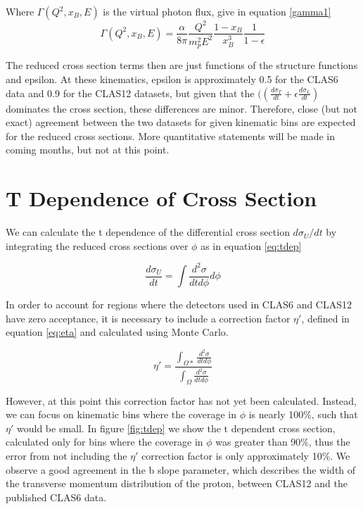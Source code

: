 Where $\Gamma (Q^2, x_B, E)$ is the virtual photon flux, give in equation \ref{gamma1}
 \begin{equation}\label{gamma1}
            \Gamma (Q^2, x_B, E) = \frac{\alpha}{8\pi} \frac{Q^2}{m^2_pE^2}\frac{1-x_B}{x_B^3}\frac{1}{1-\epsilon}
\end{equation}

The reduced cross section terms then are just functions of the structure functions and epsilon. At these kinematics, epsilon is approximately 0.5 for the CLAS6 data and 0.9 for the CLAS12 datasets, but given that the $((\frac{d\sigma_T}{dt}+\epsilon\frac{d\sigma_L}{dt})$ dominates the cross section, these differences are minor. Therefore, close (but not exact) agreement between the two datasets for given kinematic bins are expected for the reduced cross sections. More quantitative statements will be made in coming months, but not at this point.


\section{T Dependence of Cross Section}

We can calculate the t dependence of the differential cross section $d\sigma_U/dt$ by integrating the reduced cross sections over $\phi$ as in equation \ref{eq:tdep}

 \begin{equation}\label{eq:tdep}
    \frac{d\sigma_U}{dt} = \int \frac{d^2\sigma}{dtd\phi} d\phi
\end{equation}

In order to account for regions where the detectors used in CLAS6 and CLAS12 have zero acceptance, it is necessary to include a correction factor $\eta'$, defined in equation \ref{eq:eta} and calculated using Monte Carlo. 

 \begin{equation}\label{eq:eta}
    \eta' = \frac{\int_{\Omega*} \frac{d^2\sigma}{dtd\phi} }{\int_{\Omega} \frac{d^2\sigma}{dtd\phi}}
\end{equation}

However, at this point this correction factor has not yet been calculated. Instead, we can focus on kinematic bins where the coverage in $\phi$ is nearly 100\%, such that $\eta'$ would be small. In figure \ref{fig:tdep} we show the t dependent cross section, calculated only for bins where the coverage in $\phi$ was greater than 90\%, thus the error from not including the $\eta'$ correction factor is only approximately 10\%. We observe a good agreement in the b slope parameter, which describes the width of the transverse momentum distribution of the proton, between CLAS12 and the published CLAS6 data.



